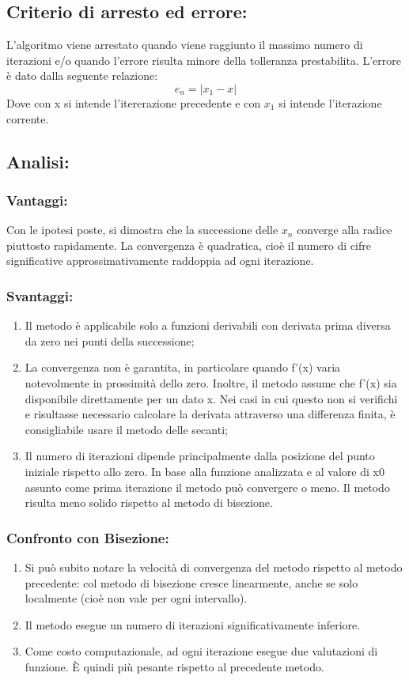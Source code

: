 \documentclass[a4paper,11pt]{article}
\begin{document}
\subsection{Criterio di arresto ed errore:}
L'algoritmo viene arrestato quando viene raggiunto il massimo numero di iterazioni e/o quando l'errore risulta minore della tolleranza prestabilita.
L'errore è dato dalla seguente relazione:
\begin{equation} e_n=|x_1-x| \end{equation}
Dove con x si intende l'itererazione precedente e con $x_1$ si intende l'iterazione corrente.
\subsection{Analisi:}
\subsubsection{Vantaggi:}
Con le ipotesi poste, si dimostra che la successione delle $x_n$ converge alla radice piuttosto rapidamente.
La convergenza è quadratica, cioè il numero di cifre significative approssimativamente raddoppia ad ogni iterazione.
\subsubsection{Svantaggi:}
\begin{enumerate}
\item Il metodo è applicabile solo a funzioni derivabili con derivata prima diversa da zero nei punti della successione;
\\
\item La convergenza non è garantita, in particolare quando f'(x) varia notevolmente in prossimità dello zero. 
Inoltre, il metodo assume che f'(x) sia disponibile direttamente per un dato x. Nei casi in cui questo non si verifichi e risultasse necessario calcolare la derivata attraverso una differenza finita, è consigliabile usare il metodo delle secanti;
\\
\item Il numero di iterazioni dipende principalmente dalla posizione del punto iniziale rispetto allo zero. 
In base alla funzione analizzata e al valore di x0 assunto come prima iterazione il metodo può convergere o meno. Il metodo risulta meno solido rispetto al metodo di bisezione.
\end{enumerate}
\subsubsection{Confronto con Bisezione:}
\begin{enumerate}
\item Si può subito notare la velocità di convergenza del metodo rispetto al metodo precedente: col metodo di bisezione cresce linearmente, anche se solo localmente (cioè non vale per ogni intervallo).
\item Il metodo esegue un numero di iterazioni significativamente inferiore. 
\item  Come costo computazionale, ad ogni iterazione esegue due valutazioni di funzione. È quindi più pesante rispetto al precedente metodo. 

\end{enumerate}
\end{document}
